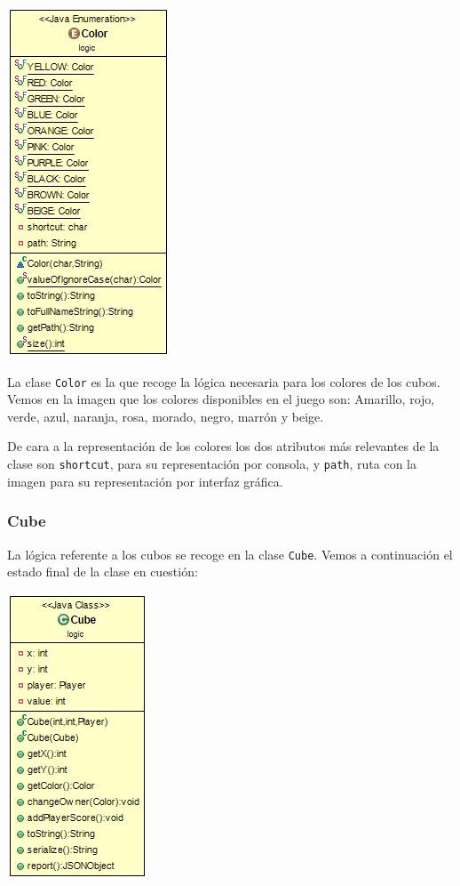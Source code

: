 \documentclass[../DocumentoOficial.tex]{subfiles}
\begin{document}
\begin{center}
\includegraphics[scale=0.55]{Color-sprint7.png}
\end{center}

La clase \texttt{Color} es la que recoge la lógica necesaria para los colores de los cubos. Vemos en la imagen que los colores disponibles en el juego son: Amarillo, rojo, verde, azul, naranja, rosa, morado, negro, marrón y beige.

De cara a la representación de los colores los dos atributos más relevantes de la clase son \texttt{shortcut}, para su representación por consola, y \texttt{path}, ruta con la imagen para su representación por interfaz gráfica.

\subsubsection{Cube}

La lógica referente a los cubos se recoge en la clase \texttt{Cube}.
Vemos a continuación el estado final de la clase en cuestión:

\begin{center}
\includegraphics[scale=0.55]{Cube-sprint7.png} 
\end{center}
\end{document}
